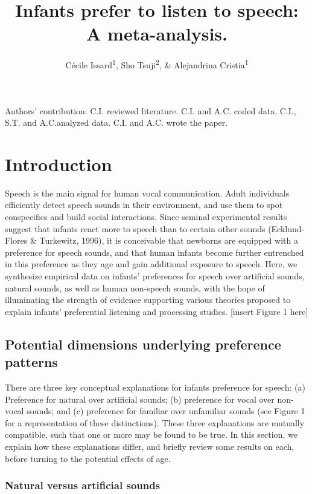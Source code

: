 \documentclass[man]{apa6}
\title{Infants prefer to listen to speech: A meta-analysis.}
\author{Cécile Issard\textsuperscript{1}, Sho Tsuji\textsuperscript{2}, \&
Alejandrina Cristia\textsuperscript{1}}
\date{}
\affiliation{
\vspace{0.5cm}
\textsuperscript{1} Laboratoire de Sciences Cognitives et Psycholinguistique, Ecole Normale Supérieure, Département d'Études Cognitives\\\textsuperscript{2} International Research Center for Neurointelligence, The University of Tokyo}
\begin{document}
\maketitle

Authors' contribution: C.I. reviewed literature. C.I. and A.C. coded
data. C.I., S.T. and A.C.analyzed data. C.I. and A.C. wrote the paper.

\section{Introduction}\label{introduction}

Speech is the main signal for human vocal communication. Adult
individuals efficiently detect speech sounds in their environment, and
use them to spot conspecifics and build social interactions. Since
seminal experimental results suggest that infants react more to speech
than to certain other sounds (Ecklund-Flores \& Turkewitz, 1996), it is
conceivable that newborns are equipped with a preference for speech
sounds, and that human infants become further entrenched in this
preference as they age and gain additional exposure to speech. Here, we
synthesize empirical data on infants' preferences for speech over
artificial sounds, natural sounds, as well as human non-speech sounds,
with the hope of illuminating the strength of evidence supporting
various theories proposed to explain infants' preferential listening and
processing studies. {[}insert Figure 1 here{]}

\subsection{Potential dimensions underlying preference
patterns}\label{potential-dimensions-underlying-preference-patterns}

There are three key conceptual explanations for infants preference for
speech: (a) Preference for natural over artificial sounds; (b)
preference for vocal over non-vocal sounds; and (c) preference for
familiar over unfamiliar sounds (see Figure 1 for a representation of
these distinctions). These three explanations are mutually compatible,
such that one or more may be found to be true. In this section, we
explain how these explanations differ, and briefly review some results
on each, before turning to the potential effects of age.

\subsubsection{Natural versus artificial
sounds}\label{natural-versus-artificial-sounds}
\end{document}
